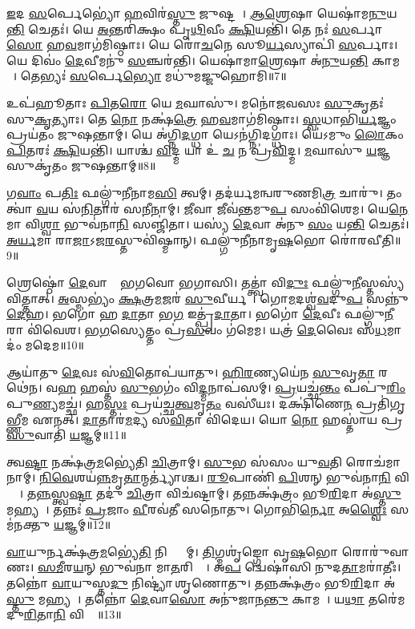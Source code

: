 \ul{𑌇}𑌦 \ul{𑌸}𑌰𑍍𑌪𑍇𑌭𑍍𑌯𑍋॑ \ul{𑌹}𑌵𑌿𑌰॑\ul{𑌸𑍍𑌤𑍁} 𑌜𑍁𑌷𑍍𑌟𑌮𑍍᳚।
\ul{𑌆}\ul{𑌶𑍍𑌰𑍇}𑌷𑌾 𑌯𑍇𑌷𑌾॑𑌮\ul{𑌨𑍁}𑌯\ul{𑌨𑍍𑌤𑌿} 𑌚𑍇𑌤𑌃॑।
𑌯𑍇 \ul{𑌅}𑌨𑍍𑌤𑌰𑌿॑𑌕𑍍𑌷𑌂 𑌪𑍃\ul{𑌥𑌿}𑌵𑍀𑌂 \ul{𑌕𑍍𑌷𑌿}𑌯𑌨𑍍𑌤𑌿॑।
𑌤𑍇 𑌨𑌃॑ \ul{𑌸}𑌰𑍍𑌪𑌾\ul{𑌸𑍋} 𑌹\ul{𑌵}𑌮𑌾𑌗॑𑌮𑌿𑌷𑍍𑌠𑌾𑌃।
𑌯𑍇 𑌰𑍋॑\ul{𑌚}𑌨𑍇 𑌸𑍂\ul{𑌰𑍍𑌯}𑌸𑍍𑌯𑌾𑌪𑌿॑ \ul{𑌸}𑌰𑍍𑌪𑌾𑌃।
𑌯𑍇 𑌦𑌿𑌵𑌂॑ \ul{𑌦𑍇}𑌵𑍀𑌮𑌨𑍁॑ \ul{𑌸}𑌞𑍍𑌚𑌰॑𑌨𑍍𑌤𑌿।
𑌯𑍇𑌷𑌾॑𑌮𑌾\ul{𑌶𑍍𑌰𑍇}𑌷𑌾 𑌅॑\ul{𑌨𑍁}𑌯\ul{𑌨𑍍𑌤𑌿} 𑌕𑌾𑌮𑌮𑍍᳚।
𑌤𑍇𑌭𑍍𑌯𑌃॑ \ul{𑌸}𑌰𑍍𑌪𑍇\ul{𑌭𑍍𑌯𑍋} 𑌮𑌧𑍁॑𑌮𑌜𑍍𑌜𑍁𑌹𑍋𑌮𑌿॥7॥ 

𑌉𑌪॑𑌹𑍂𑌤𑌾𑌃 \ul{𑌪𑌿}𑌤\ul{𑌰𑍋} 𑌯𑍇 \ul{𑌮}𑌘𑌾𑌸𑍁॑।
𑌮𑌨𑍋॑𑌜𑌵𑌸𑌃 \ul{𑌸𑍁}𑌕𑍃𑌤𑌃॑ 𑌸𑍁\ul{𑌕𑍃}𑌤𑍍𑌯𑌾𑌃।
𑌤𑍇 \ul{𑌨𑍋} 𑌨𑌕𑍍𑌷॑\ul{𑌤𑍍𑌰𑍇} 𑌹\ul{𑌵}𑌮𑌾𑌗॑𑌮𑌿𑌷𑍍𑌠𑌾𑌃।
\ul{𑌸𑍍𑌵}𑌧𑌾𑌭𑌿॑\ul{𑌰𑍍𑌯}𑌜𑍍𑌞𑌂 𑌪𑍍𑌰𑌯॑𑌤𑌂 𑌜𑍁𑌷𑌨𑍍𑌤𑌾𑌮𑍍।
𑌯𑍇 𑌅॑𑌗𑍍𑌨𑌿\ul{𑌦}𑌗𑍍𑌧𑌾 𑌯𑍇𑌽𑌨॑𑌗𑍍𑌨𑌿𑌦𑌗𑍍𑌧𑌾𑌃।
𑌯𑍇॑𑌽𑌮𑍁𑌂 \ul{𑌲𑍋}𑌕𑌂 \ul{𑌪𑌿}𑌤𑌰𑌃॑ \ul{𑌕𑍍𑌷𑌿}𑌯𑌨𑍍𑌤𑌿॑।
𑌯𑌾𑌶𑍍𑌚॑ \ul{𑌵𑌿}𑌦𑍍𑌮 𑌯𑌾 𑌉॑ \ul{𑌚} 𑌨 𑌪𑍍𑌰॑\ul{𑌵𑌿}𑌦𑍍𑌮।
\ul{𑌮}𑌘𑌾𑌸𑍁॑ \ul{𑌯}𑌜𑍍𑌞 𑌸𑍁𑌕𑍃॑𑌤𑌂 𑌜𑍁𑌷𑌨𑍍𑌤𑌾𑌮𑍍॥8॥ 

𑌗\ul{𑌵𑌾𑌂} 𑌪\ul{𑌤𑌿𑌃} 𑌫𑌲𑍍𑌗𑍁॑𑌨𑍀𑌨𑌾𑌮\ul{𑌸𑌿} 𑌤𑍍𑌵𑌮𑍍।
𑌤𑌦॑𑌰𑍍𑌯𑌮𑌨𑍍𑌵𑌰𑍁𑌣𑌮𑌿\ul{𑌤𑍍𑌰} 𑌚𑌾𑌰𑍁॑।
𑌤𑌂 𑌤𑍍𑌵𑌾॑ \ul{𑌵}𑌯 𑌸॑\ul{𑌨𑌿}𑌤𑌾𑌰॑ 𑌸\ul{𑌨𑍀}𑌨𑌾𑌮𑍍।
\ul{𑌜𑍀}𑌵𑌾 𑌜𑍀𑌵॑\ul{𑌨𑍍𑌤}𑌮𑍁\ul{𑌪} 𑌸𑌂𑌵𑌿॑𑌶𑍇𑌮।
𑌯𑍇\ul{𑌨𑍇}𑌮𑌾 𑌵𑌿\ul{𑌶𑍍𑌵𑌾} 𑌭𑍁𑌵॑𑌨𑌾\ul{𑌨𑌿} 𑌸𑌞𑍍𑌜𑌿॑𑌤𑌾।
𑌯𑌸𑍍𑌯॑ \ul{𑌦𑍇}𑌵𑌾 𑌅॑𑌨𑍁 \ul{𑌸𑌂} 𑌯\ul{𑌨𑍍𑌤𑌿} 𑌚𑍇𑌤𑌃॑।
\ul{𑌅}\ul{𑌰𑍍𑌯}𑌮𑌾 𑌰𑌾\ul{𑌜𑌾}\-𑌽𑌜\ul{𑌰}𑌸𑍍𑌤𑍁𑌵𑌿॑𑌷𑍍𑌮𑌾𑌨𑍍।
𑌫𑌲𑍍𑌗𑍁॑𑌨𑍀𑌨𑌾𑌮𑍃\ul{𑌷}𑌭𑍋 𑌰𑍋॑𑌰𑌵𑍀𑌤𑌿॥9॥ 

𑌶𑍍𑌰𑍇𑌷𑍍𑌠𑍋॑ \ul{𑌦𑍇}𑌵𑌾𑌨𑌾𑌂᳚ 𑌭𑌗𑌵𑍋 𑌭𑌗𑌾𑌸𑌿।
𑌤𑌤𑍍𑌤𑍍𑌵𑌾॑ 𑌵𑌿\ul{𑌦𑍁𑌃} 𑌫𑌲𑍍𑌗𑍁॑\ul{𑌨𑍀}𑌸𑍍𑌤𑌸𑍍𑌯॑ 𑌵𑌿𑌤𑍍𑌤𑌾𑌤𑍍।
\ul{𑌅}𑌸𑍍𑌮𑌭𑍍𑌯𑌂॑ \ul{𑌕𑍍𑌷}𑌤𑍍𑌰\ul{𑌮}𑌜𑌰॑ \ul{𑌸𑍁}𑌵𑍀𑌰𑍍𑌯𑌮𑍍᳚।
𑌗𑍋\ul{𑌮}𑌦𑌶𑍍𑌵॑\ul{𑌵}𑌦𑍁\ul{𑌪} 𑌸𑌨𑍍𑌨𑍁॑\-\ul{𑌦𑍇}𑌹।
𑌭𑌗𑍋॑ 𑌹 \ul{𑌦𑌾}𑌤𑌾 𑌭\ul{𑌗} 𑌇𑌤𑍍𑌪𑍍𑌰॑\ul{𑌦𑌾}𑌤𑌾।
𑌭𑌗𑍋॑ \ul{𑌦𑍇}𑌵𑍀𑌃 𑌫𑌲𑍍𑌗𑍁॑\ul{𑌨𑍀}𑌰𑌾 𑌵𑌿॑𑌵𑍇𑌶।
𑌭\ul{𑌗}𑌸𑍍𑌯𑍇𑌤𑍍𑌤𑌂 𑌪𑍍𑌰॑\ul{𑌸}𑌵𑌂 𑌗॑𑌮𑍇𑌮।
𑌯𑌤𑍍𑌰॑ \ul{𑌦𑍇}𑌵𑍈𑌃 𑌸॑\ul{𑌧}𑌮𑌾𑌦𑌂॑ 𑌮𑌦𑍇𑌮॥10॥ 

𑌆𑌯𑌾॑𑌤𑍁 \ul{𑌦𑍇}𑌵𑌃 𑌸॑\ul{𑌵𑌿}𑌤𑍋𑌪॑𑌯𑌾𑌤𑍁।
\ul{𑌹𑌿}\ul{𑌰}𑌣𑍍𑌯𑌯𑍇॑𑌨 \ul{𑌸𑍁}𑌵𑍃\ul{𑌤𑌾} 𑌰𑌥𑍇॑𑌨।
𑌵\ul{𑌹}\an{} 𑌹𑌸𑍍𑌤॑ \ul{𑌸𑍁}𑌭𑌗𑌂॑ 𑌵𑌿\ul{𑌦𑍍𑌮}𑌨𑌾𑌪॑𑌸𑌮𑍍।
\ul{𑌪𑍍𑌰}𑌯𑌚𑍍𑌛॑\ul{𑌨𑍍𑌤𑌂} 𑌪𑌪𑍁॑\ul{𑌰𑌿𑌂} 𑌪𑍁\ul{𑌣𑍍𑌯}𑌮𑌚𑍍𑌛॑।
𑌹\ul{𑌸𑍍𑌤𑌃} 𑌪𑍍𑌰𑌯॑𑌚𑍍𑌛\ul{𑌤𑍍𑌵}𑌮𑍃\ul{𑌤𑌂} 𑌵𑌸𑍀॑𑌯𑌃।
𑌦𑌕𑍍𑌷𑌿॑𑌣𑍇\ul{𑌨} 𑌪𑍍𑌰𑌤𑌿॑𑌗𑍃𑌭𑍍𑌣𑍀𑌮 𑌏𑌨𑌤𑍍।
\ul{𑌦𑌾}𑌤𑌾𑌰॑\ul{𑌮}𑌦𑍍𑌯 𑌸॑\ul{𑌵𑌿}𑌤𑌾 𑌵𑌿॑𑌦𑍇𑌯।
𑌯𑍋 \ul{𑌨𑍋} 𑌹𑌸𑍍𑌤𑌾॑𑌯 𑌪𑍍𑌰\ul{𑌸𑍁}𑌵𑌾𑌤𑌿॑ \ul{𑌯}𑌜𑍍𑌞𑌮𑍍॥11॥ 

𑌤𑍍𑌵\ul{𑌷𑍍𑌟𑌾} 𑌨𑌕𑍍𑌷॑𑌤𑍍𑌰\ul{𑌮}𑌭𑍍𑌯𑍇॑𑌤𑌿 \ul{𑌚𑌿}𑌤𑍍𑌰𑌾𑌮𑍍।
\ul{𑌸𑍁}𑌭 𑌸॑𑌸𑌂 𑌯𑍁\ul{𑌵}𑌤𑌿 𑌰𑍋𑌚॑𑌮𑌾𑌨𑌾𑌮𑍍।
\ul{𑌨𑌿}\ul{𑌵𑍇}𑌶𑌯॑\ul{𑌨𑍍𑌨}\-𑌮𑍃\ul{𑌤𑌾}𑌨𑍍𑌮𑌰𑍍𑌤𑍍𑌯𑌾॑𑌶𑍍𑌚।
\ul{𑌰𑍂}𑌪𑌾𑌣𑌿॑ \ul{𑌪𑌿}\ul{}𑌶𑌨𑍍 𑌭𑍁𑌵॑𑌨𑌾\ul{𑌨𑌿} 𑌵𑌿𑌶𑍍𑌵𑌾᳚।
𑌤\ul{𑌨𑍍𑌨}𑌸𑍍𑌤𑍍𑌵\ul{𑌷𑍍𑌟𑌾} 𑌤𑌦𑍁॑ \ul{𑌚𑌿}𑌤𑍍𑌰𑌾 𑌵𑌿𑌚॑𑌷𑍍𑌟𑌾𑌮𑍍।
𑌤𑌨𑍍𑌨𑌕𑍍𑌷॑𑌤𑍍𑌰𑌂 𑌭𑍂\ul{𑌰𑌿}𑌦𑌾 𑌅॑\ul{𑌸𑍍𑌤𑍁} 𑌮𑌹𑍍𑌯𑌮𑍍᳚।
𑌤𑌨𑍍𑌨𑌃॑ \ul{𑌪𑍍𑌰}𑌜𑌾𑌂 \ul{𑌵𑍀}𑌰𑌵॑𑌤𑍀 𑌸𑌨𑍋𑌤𑍁।
𑌗𑍋𑌭𑌿॑\ul{𑌰𑍍𑌨𑍋} 𑌅\ul{𑌶𑍍𑌵𑍈𑌃} 𑌸𑌮॑𑌨𑌕𑍍𑌤𑍁 \ul{𑌯}𑌜𑍍𑌞𑌮𑍍॥12॥ 

\ul{𑌵𑌾}𑌯𑍁𑌰𑍍𑌨𑌕𑍍𑌷॑𑌤𑍍𑌰\ul{𑌮}𑌭𑍍𑌯𑍇॑\ul{𑌤𑌿} 𑌨𑌿𑌷𑍍𑌟𑍍𑌯𑌾᳚𑌮𑍍।
\ul{𑌤𑌿}𑌗𑍍𑌮𑌶𑍃॑𑌙𑍍𑌗𑍋 𑌵𑍃\ul{𑌷}𑌭𑍋 𑌰𑍋𑌰𑍁॑𑌵𑌾𑌣𑌃।
\ul{𑌸}\ul{𑌮𑍀}𑌰\ul{𑌯}𑌨𑍍 𑌭𑍁𑌵॑𑌨𑌾 𑌮𑌾\ul{𑌤}𑌰𑌿𑌶𑍍𑌵𑌾᳚।
𑌅\ul{𑌪} 𑌦𑍍𑌵𑍇𑌷𑌾॑𑌸𑌿 𑌨𑍁𑌦\ul{𑌤𑌾}𑌮𑌰𑌾॑𑌤𑍀𑌃।
𑌤𑌨𑍍𑌨𑍋॑ \ul{𑌵𑌾}𑌯𑍁𑌸𑍍𑌤\ul{𑌦𑍁} 𑌨𑌿𑌷𑍍𑌟𑍍𑌯𑌾॑ 𑌶𑍃𑌣𑍋𑌤𑍁।
𑌤𑌨𑍍𑌨𑌕𑍍𑌷॑𑌤𑍍𑌰𑌂 𑌭𑍂\ul{𑌰𑌿}𑌦𑌾 𑌅॑\ul{𑌸𑍍𑌤𑍁} 𑌮𑌹𑍍𑌯𑌮𑍍᳚।
𑌤𑌨𑍍𑌨𑍋॑ \ul{𑌦𑍇}𑌵𑌾\ul{𑌸𑍋} 𑌅𑌨𑍁॑𑌜𑌾𑌨\ul{𑌨𑍍𑌤𑍁} 𑌕𑌾𑌮𑌮𑍍᳚।
𑌯\ul{𑌥𑌾} 𑌤𑌰𑍇॑𑌮 𑌦𑍁\ul{𑌰𑌿}𑌤𑌾\ul{𑌨𑌿} 𑌵𑌿𑌶𑍍𑌵𑌾᳚॥13॥ 

